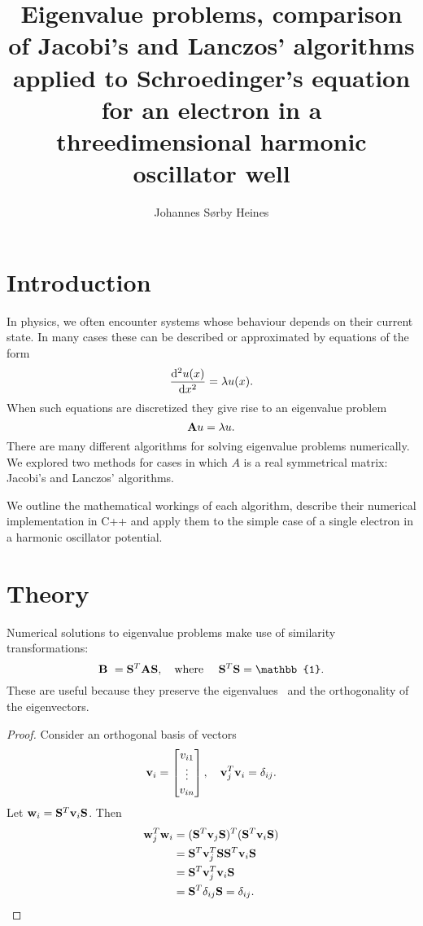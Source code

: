 \documentclass[a4paper,10pt,twocolumn]{article}
\title{Eigenvalue problems, comparison of Jacobi's and Lanczos' algorithms applied to Schroedinger’s equation for an electron in a threedimensional
harmonic oscillator well}
\author{Johannes Sørby Heines}
\begin{document}
\twocolumn[
\begin{@twocolumnfalse}
\maketitle
\begin{abstract}

\end{abstract}
\end{@twocolumnfalse}
]

\section*{Introduction}

In physics, we often encounter systems whose behaviour depends on their current state. In many cases these can be described or approximated by equations of the form  
\[
\dv[2]{u(x)}{x} = \lambda u(x).
\]
When such equations are discretized they give rise to an eigenvalue problem
\[
\vb{A}u = \lambda u.
\]
There are many different algorithms for solving eigenvalue problems numerically. We explored two methods for cases in which $A$ is a real symmetrical matrix: Jacobi's and Lanczos' algorithms.  

We outline the mathematical workings of each algorithm, describe their numerical implementation in C++ and apply them to the simple case of a single electron in a harmonic oscillator potential. 

%
%
%
\section*{Theory}

Numerical solutions to eigenvalue problems make use of similarity transformations:
\[
\vb{B} = \vb{S}^T\vb{A}\vb{S}, \qq{where} \vb{S}^T\vb{S} = \mathbb{1}.
\]
These are useful because they preserve the eigenvalues \cite{lecture} and the orthogonality of the eigenvectors.
 \begin{proof}
Consider an orthogonal basis of vectors 
\[
\vb{v}_i = \bmqty{v_{i1}\\\vdots\\v_{in}}\qcomma \vb{v}_j^T\vb{v}_i = \delta_{ij}.
\]
Let \(\vb{w}_i = \vb{S}^T\vb{v}_i\vb{S}\). Then
\begin{align*}
\vb{w}_j^T\vb{w}_i &= (\vb{S}^T\vb{v}_j\vb{S})^T(\vb{S}^T\vb{v}_i\vb{S}) 
\\& = \vb{S}^T\vb{v}_j^T\vb{S}\vb{S}^T\vb{v}_i\vb{S}
\\& = \vb{S}^T\vb{v}_j^T\vb{v}_i\vb{S}
\\& = \vb{S}^T\delta_{ij}\vb{S} = \delta_{ij}.
\end{align*}

\end{proof}
\end{document}
